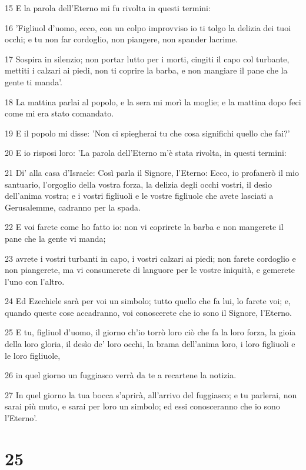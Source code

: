 \par 15 E la parola dell'Eterno mi fu rivolta in questi termini:
\par 16 'Figliuol d'uomo, ecco, con un colpo improvviso io ti tolgo la delizia dei tuoi occhi; e tu non far cordoglio, non piangere, non spander lacrime.
\par 17 Sospira in silenzio; non portar lutto per i morti, cingiti il capo col turbante, mettiti i calzari ai piedi, non ti coprire la barba, e non mangiare il pane che la gente ti manda'.
\par 18 La mattina parlai al popolo, e la sera mi morì la moglie; e la mattina dopo feci come mi era stato comandato.
\par 19 E il popolo mi disse: 'Non ci spiegherai tu che cosa significhi quello che fai?'
\par 20 E io risposi loro: 'La parola dell'Eterno m'è stata rivolta, in questi termini:
\par 21 Di' alla casa d'Israele: Così parla il Signore, l'Eterno: Ecco, io profanerò il mio santuario, l'orgoglio della vostra forza, la delizia degli occhi vostri, il desìo dell'anima vostra; e i vostri figliuoli e le vostre figliuole che avete lasciati a Gerusalemme, cadranno per la spada.
\par 22 E voi farete come ho fatto io: non vi coprirete la barba e non mangerete il pane che la gente vi manda;
\par 23 avrete i vostri turbanti in capo, i vostri calzari ai piedi; non farete cordoglio e non piangerete, ma vi consumerete di languore per le vostre iniquità, e gemerete l'uno con l'altro.
\par 24 Ed Ezechiele sarà per voi un simbolo; tutto quello che fa lui, lo farete voi; e, quando queste cose accadranno, voi conoscerete che io sono il Signore, l'Eterno.
\par 25 E tu, figliuol d'uomo, il giorno ch'io torrò loro ciò che fa la loro forza, la gioia della loro gloria, il desìo de' loro occhi, la brama dell'anima loro, i loro figliuoli e le loro figliuole,
\par 26 in quel giorno un fuggiasco verrà da te a recartene la notizia.
\par 27 In quel giorno la tua bocca s'aprirà, all'arrivo del fuggiasco; e tu parlerai, non sarai più muto, e sarai per loro un simbolo; ed essi conosceranno che io sono l'Eterno'.

\chapter{25}


